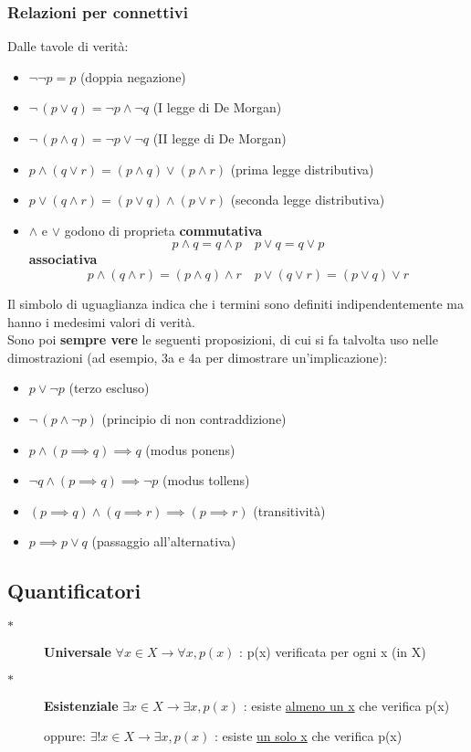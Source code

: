 \documentclass[10pt]{article}
\theoremstyle{plain}
\begin{document}
\subsubsection{Relazioni per connettivi}
Dalle tavole di verità:
\begin{itemize}
\item $\neg  \neg  p = p$ (doppia negazione)
\item $\neg \, (p \lor q) = \neg p \land \neg q$ (I legge di De Morgan)
\item $\neg \, (p \land q) = \neg p \lor \neg q$ (II legge di De Morgan)
\item $p \land (q \lor r) = (p \land q) \lor (p \land r)$ (prima legge distributiva)
\item $p \lor (q \land r) = (p \lor q) \land (p \lor r)$ (seconda legge distributiva)
\item $\land$ e $\lor$ godono di proprieta \textbf{commutativa}
\[p \land q = q \land p \quad p \lor q = q \lor p\]
\textbf{associativa}
\[p \land (q \land r) = (p \land q) \land r \quad p \lor (q \lor r) = (p \lor q) \lor r\]
\end{itemize}
Il simbolo di uguaglianza indica che i termini sono definiti indipendentemente ma hanno i medesimi valori di verità.
\\Sono poi \textbf{sempre vere} le seguenti proposizioni, di cui si fa talvolta uso nelle dimostrazioni (ad esempio, 3a e 4a per dimostrare un'implicazione):
\begin{itemize}
\item $p \lor \neg p$ (terzo escluso)
\item $\neg \, (p \land \neg p)$ (principio di non contraddizione)
\item $p \land (p \implies q) \implies q$ (modus ponens)
\item $\neg q \land (p \implies q) \implies \neg p$ (modus tollens)
\item $(p \implies q) \land (q \implies r) \implies (p \implies r)$ (transitività)
\item $p \implies p \lor q$ (passaggio all'alternativa)
\end{itemize}

\subsection{Quantificatori}
\begin{description}
   \item[$\ast$] \textbf{Universale} $\forall  x \in X \longrightarrow \forall x, p(x)$ : p(x) verificata per ogni x (in X)
   \item[$\ast$] \textbf{Esistenziale} $\exists  x \in X \longrightarrow \exists x, p(x)$ : esiste \underline{almeno un x} che verifica p(x)
    \item[] oppure: $\exists!  x \in X \longrightarrow \exists x, p(x)$ : esiste \underline{un solo x} che verifica p(x)
\end{description}
\end{document}
